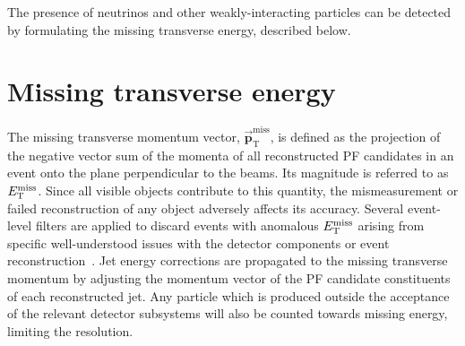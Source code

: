 The presence of neutrinos and other weakly-interacting particles can be detected by formulating
the missing transverse energy, described below.

\section{Missing transverse energy}
The missing transverse momentum vector, $\vec{\mathbf{p}}_\mathrm{T}^\mathrm{miss}$, is defined as the projection
of the negative vector sum of the momenta of all reconstructed PF candidates in an event
onto the plane perpendicular to the beams.
Its magnitude is referred to as $E_\mathrm{T}^{\mathrm{miss}}$.
Since all visible objects contribute to this quantity, the mismeasurement or failed reconstruction
of any object adversely affects its accuracy.
Several event-level filters are applied to discard events with anomalous $E_\mathrm{T}^{\mathrm{miss}}$ arising from specific well-understood issues with the detector components or event reconstruction~\cite{CMS-PAS-JME-16-004}.
Jet energy corrections are propagated to the missing transverse momentum by
adjusting the momentum vector of the PF candidate constituents of each reconstructed jet.
Any particle which is produced outside the acceptance of the relevant detector subsystems will also be counted towards missing energy, limiting the resolution.


